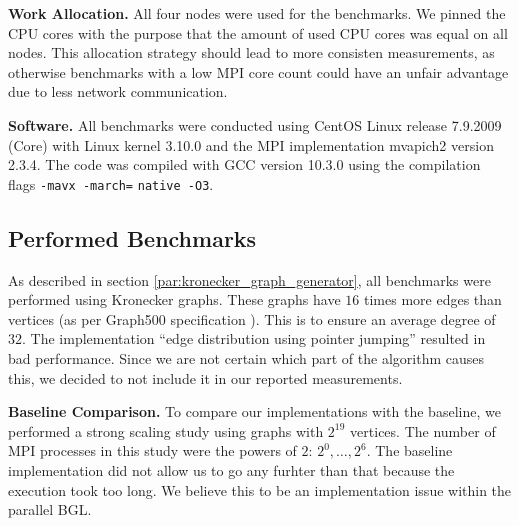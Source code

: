 \documentclass[letterpaper]{article}
\newcommand{\mypar}[1]{{\bf #1.}}
\begin{document}
\mypar{Work Allocation}
All four nodes were used for the benchmarks. We pinned the CPU cores with the purpose that the amount of used CPU cores
was equal on all nodes. This allocation strategy should lead to more consisten measurements, as otherwise benchmarks
with a low MPI core count could have an unfair advantage due to less network communication.

\mypar{Software}
All benchmarks were conducted using CentOS Linux release 7.9.2009 (Core) with Linux kernel 3.10.0 and the MPI
implementation mvapich2 version 2.3.4. The code was compiled with GCC version 10.3.0 using the compilation flags
\lstinline[basicstyle=\ttfamily\color{black},identifierstyle=\color{black}]|-mavx -march=| \linebreak
\lstinline[basicstyle=\ttfamily\color{black},identifierstyle=\color{black}]|native -O3|.

\subsection{Performed Benchmarks}
As described in section \ref{par:kronecker_graph_generator}, all benchmarks were performed using Kronecker graphs. These
graphs have $16$ times more edges than vertices (as per Graph500 specification \cite{graph500}). This is to ensure an
average degree of $32$. The implementation ``edge distribution using pointer jumping'' resulted in bad performance.
Since we are not certain which part of the algorithm causes this, we decided to not include it in our reported
measurements. %

\mypar{Baseline Comparison}
To compare our implementations with the baseline, we performed a strong scaling study using graphs with $2^{19}$
vertices. The number of MPI processes in this study were the powers of $2$: $2^0, \dotsc, 2^6$. The baseline
implementation did not allow us to go any furhter than that because the execution took too long. We believe this to be
an implementation issue within the parallel BGL.
\end{document}
